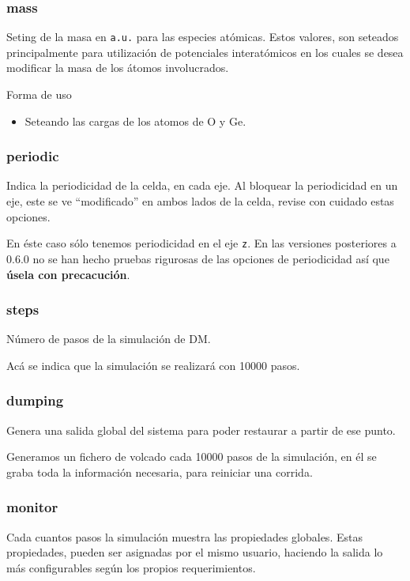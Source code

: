 \subsubsection{mass}
Seting de la masa en \verb|a.u.| para las especies at\'omicas. Estos valores, son seteados principalmente para utilizaci\'on de potenciales interat\'omicos en los cuales se desea modificar la masa de los \'atomos involucrados.


Forma de uso

\begin{itemize}
 \item Seteando las cargas de los atomos de O y Ge.
\end{itemize}


\subsubsection{periodic}
Indica la periodicidad de la celda, en cada eje. Al bloquear la periodicidad en un eje, este se ve ``modificado'' en ambos lados de la celda, revise con cuidado estas opciones.


En \'este caso s\'olo tenemos periodicidad en el eje \verb|z|. En las versiones posteriores a 0.6.0 no se han hecho pruebas rigurosas de las opciones de periodicidad as\'i que \textbf{\'usela con precacuci\'on}.

\subsubsection{steps}
N\'umero de pasos de la simulaci\'on de DM.


Ac\'a se indica que la simulaci\'on se realizar\'a con 10000 pasos.

\subsubsection{dumping}
Genera una salida global del sistema para poder restaurar a partir de ese punto.


Generamos un fichero de volcado cada 10000 pasos de la simulaci\'on, en \'el se graba toda la informaci\'on necesaria, para reiniciar una corrida.

\subsubsection{monitor}
Cada cuantos pasos la simulaci\'on muestra las propiedades globales. Estas propiedades, pueden ser asignadas por el mismo usuario, haciendo la salida lo m\'as configurables seg\'un los propios requerimientos.

